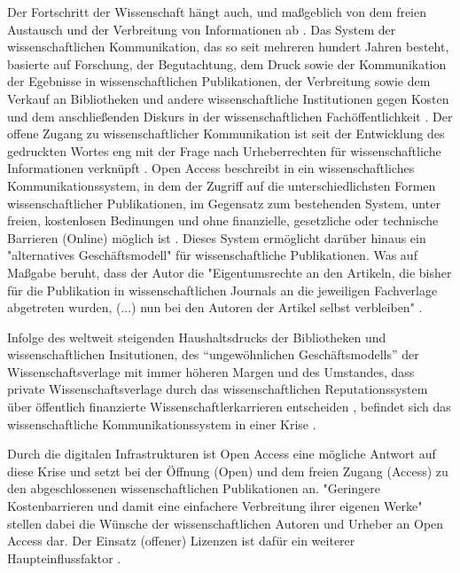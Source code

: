 Der Fortschritt der Wissenschaft hängt auch, und maßgeblich von dem freien Austausch und der Verbreitung von Informationen ab \cite{cite:11}. Das System der wissenschaftlichen Kommunikation, das so seit mehreren hundert Jahren besteht, basierte auf Forschung, der Begutachtung, dem Druck sowie der Kommunikation der Egebnisse in wissenschaftlichen Publikationen, der Verbreitung sowie dem Verkauf an Bibliotheken und andere wissenschaftliche Institutionen gegen Kosten \cite{cite:11a} und dem anschließenden Diskurs in der wissenschaftlichen Fachöffentlichkeit \cite{suchen}. Der offene Zugang zu wissenschaftlicher Kommunikation ist seit der Entwicklung des gedruckten Wortes eng mit der Frage nach Urheberrechten für wissenschaftliche Informationen verknüpft \cite{Case_2000}. Open Access beschreibt in ein wissenschaftliches Kommunikationssystem, in dem der Zugriff auf die unterschiedlichsten Formen wissenschaftlicher Publikationen, im Gegensatz zum bestehenden System, unter freien, kostenlosen Bedinungen und ohne finanzielle, gesetzliche oder technische Barrieren (Online) möglich ist \cite{WD_bundestag_2009}. Dieses System ermöglicht darüber hinaus ein "alternatives Geschäftsmodell"\cite{lewis_2012_inevitability} für wissenschaftliche Publikationen. Was auf Maßgabe beruht, dass der Autor die "Eigentumsrechte an den Artikeln, die bisher für die Publikation in wissenschaftlichen Journals an die jeweiligen Fachverlage abgetreten wurden, (...) nun bei den Autoren der Artikel selbst verbleiben" \cite{Hess_2006}. 

Infolge des weltweit steigenden Haushaltsdrucks der Bibliotheken und wissenschaftlichen Insitutionen, des “ungewöhnlichen Geschäftsmodells” \cite{cite:12} der Wissenschaftsverlage mit immer höheren Margen \cite{albert_2006_open_implications} und des Umstandes, dass private Wissenschaftsverlage durch das wissenschaftlichen Reputationssystem über öffentlich finanzierte Wissenschaftlerkarrieren entscheiden \cite{heise_2012}, befindet sich das wissenschaftliche Kommunikationssystem in einer Krise \cite{cite:14}. 

Durch die digitalen Infrastrukturen ist Open Access eine mögliche Antwort auf diese Krise und setzt bei der Öffnung (Open) und dem freien Zugang (Access) zu den abgeschlossenen wissenschaftlichen Publikationen an. "Geringere Kostenbarrieren und damit eine einfachere Verbreitung ihrer eigenen Werke" \cite{WD_bundestag_2009} stellen dabei die Wünsche der wissenschaftlichen Autoren und Urheber an Open Access dar. Der Einsatz (offener) Lizenzen ist dafür ein weiterer Haupteinflussfaktor \cite{cite:16}. 

